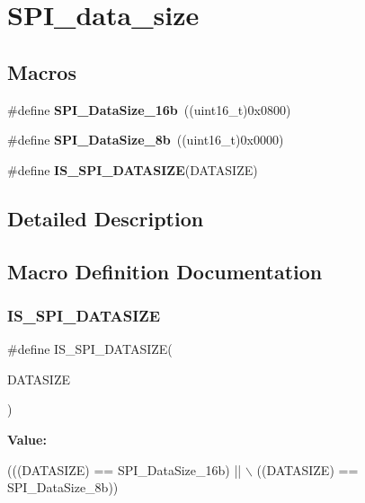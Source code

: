 \hypertarget{group___s_p_i__data__size}{}\section{S\+P\+I\+\_\+data\+\_\+size}
\label{group___s_p_i__data__size}
\subsection*{Macros}
\begin{DoxyCompactItemize}
\item 
\mbox{\label{group___s_p_i__data__size_ga8af2c8ca5c2162423531ebf560e0a41d}} 
\#define {\bfseries S\+P\+I\+\_\+\+Data\+Size\+\_\+16b}~((uint16\+\_\+t)0x0800)
\item 
\mbox{\label{group___s_p_i__data__size_ga56721814a935922b6ca7c49060509765}} 
\#define {\bfseries S\+P\+I\+\_\+\+Data\+Size\+\_\+8b}~((uint16\+\_\+t)0x0000)
\item 
\#define {\bfseries I\+S\+\_\+\+S\+P\+I\+\_\+\+D\+A\+T\+A\+S\+I\+ZE}(D\+A\+T\+A\+S\+I\+ZE)
\end{DoxyCompactItemize}


\subsection{Detailed Description}


\subsection{Macro Definition Documentation}
\mbox{\label{group___s_p_i__data__size_gab6f9f528f7eb70373b9caf3548e44e67}} 
\subsubsection{\texorpdfstring{I\+S\+\_\+\+S\+P\+I\+\_\+\+D\+A\+T\+A\+S\+I\+ZE}{IS\_SPI\_DATASIZE}}
{\footnotesize\ttfamily \#define I\+S\+\_\+\+S\+P\+I\+\_\+\+D\+A\+T\+A\+S\+I\+ZE(\begin{DoxyParamCaption}\item[{}]{D\+A\+T\+A\+S\+I\+ZE }\end{DoxyParamCaption})}

{\bfseries Value\+:}
\begin{DoxyCode}
(((DATASIZE) == SPI\_DataSize\_16b) || \(\backslash\)
                                   ((DATASIZE) == SPI\_DataSize\_8b))
\end{DoxyCode}

